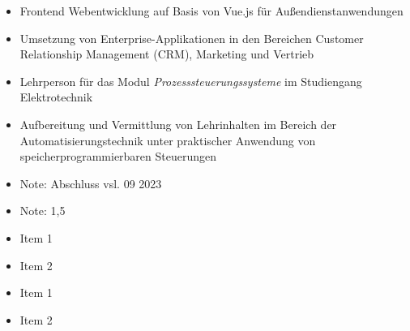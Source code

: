 \documentclass[10pt,a4paper,ragged2e,withhyper]{altacv}
\begin{document}
\begin{paracol}{2}
            \begin{itemize}
                \item Frontend Webentwicklung auf Basis von Vue.js für Außendienstanwendungen
                \item Umsetzung von Enterprise-Applikationen in den Bereichen Customer Relationship Management (CRM), Marketing und Vertrieb
            \end{itemize}
            \divider

            \begin{itemize}
                \item Lehrperson für das Modul \textit{Prozesssteuerungssysteme} im Studiengang Elektrotechnik
                \item Aufbereitung und Vermittlung von Lehrinhalten im Bereich der Automatisierungstechnik unter praktischer Anwendung von speicherprogrammierbaren Steuerungen
            \end{itemize}
        
            \begin{itemize}
                \item Note: Abschluss vsl. 09 2023
            \end{itemize}
            \divider
            
            \begin{itemize}
                \item Note: 1,5
            \end{itemize}
        
            \begin{itemize}
                \item Item 1
                \item Item 2
            \end{itemize}
            \divider
            
            \begin{itemize}
                \item Item 1
                \item Item 2
            \end{itemize}
    \end{paracol}
\end{document}
